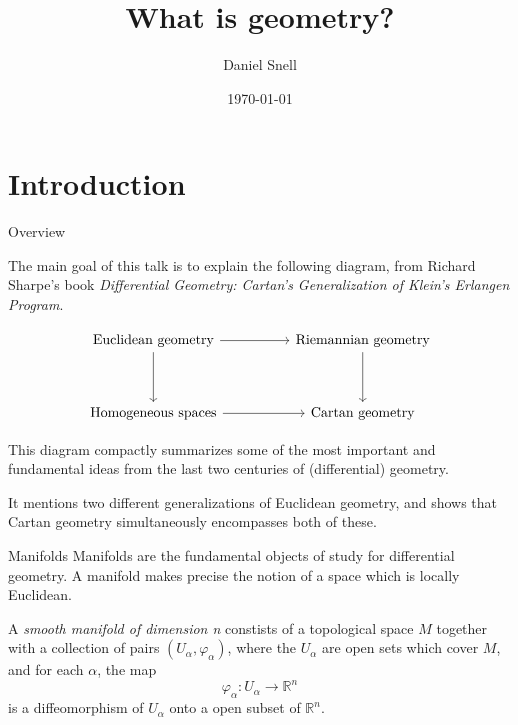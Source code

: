 \documentclass[handout]{beamer}
\title[What is geometry?]{What is geometry?}
\author[Daniel Snell]{Daniel Snell}
\date{\today}
\newcommand{\RR}{\mathbb{R}}
\renewcommand{\phi}{\varphi}
\begin{document}
\begin{frame}
  \titlepage
\end{frame}

\section{Introduction}

\begin{frame}{Overview}

  The main goal of this talk is to explain the following diagram, from Richard Sharpe's book \emph{Differential Geometry: Cartan's Generalization of Klein's Erlangen Program}.

\vspace{1em}
\[
\begin{tikzcd}[ampersand replacement=\&, row sep=huge, column sep=huge]
\textnormal{Euclidean geometry} \arrow[r] \arrow[d] \& \textnormal{Riemannian geometry} \arrow[d]\\
\textnormal{Homogeneous spaces} \arrow[r] \& \textnormal{Cartan geometry}
\end{tikzcd}
\]

\vspace{1em}

This diagram compactly summarizes some of the most important and fundamental ideas from the last two centuries of (differential) geometry.

It mentions two different generalizations of Euclidean geometry, and shows that Cartan geometry simultaneously encompasses both of these.

\end{frame}

%

\begin{frame}{Manifolds}
  Manifolds are the fundamental objects of study for differential geometry. 
  A manifold makes precise the notion of a space which is locally Euclidean.
  \begin{definition}
    A \emph{smooth manifold of dimension n} constists of a topological space $M$ together with a collection of pairs $(U_\alpha, \phi_\alpha)$, where the $U_\alpha$ are open sets which cover $M$, and for each $\alpha$, the map
    \[
      \phi_\alpha : U_\alpha \to \RR^n
    \]
    is a diffeomorphism of $U_\alpha$ onto a open subset of $\RR^n$.
  \end{definition}
\end{frame}
\end{document}
